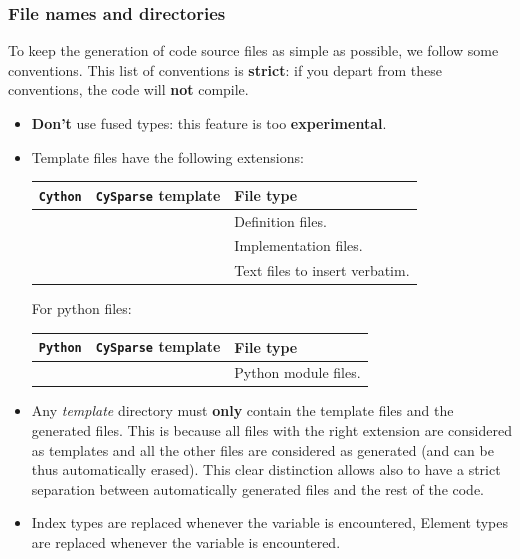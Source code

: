 \documentclass[letterpaper,10pt,english]{sphinxmanual}
\begin{document}
\subsubsection{File names and directories}
\label{cysparse_lib_mainteners:file-names-and-directories}
To keep the generation of code source files as simple as possible, we follow some conventions. This list of conventions is \textbf{strict}: if you depart from these conventions, the code will \textbf{not} compile.
\begin{itemize}
\item {} 
\textbf{Don't} use fused types: this feature is too \textbf{experimental}.

\item {} 
Template files have the following extensions:

\begin{tabulary}{\linewidth}{|L|L|L|}
\hline
\textsf{\relax 
\textbf{\texttt{Cython}}
} & \textsf{\relax 
\textbf{\texttt{CySparse}} template
} & \textsf{\relax 
File type
}\\
\hline
{}
 & 
 & 
Definition files.
\\
\hline
{}
 & 
 & 
Implementation files.
\\
\hline
{}
 & 
 & 
Text files to insert verbatim.
\\
\hline\end{tabulary}


For python files:

\begin{tabulary}{\linewidth}{|L|L|L|}
\hline
\textsf{\relax 
\textbf{\texttt{Python}}
} & \textsf{\relax 
\textbf{\texttt{CySparse}} template
} & \textsf{\relax 
File type
}\\
\hline
{}
 & 
 & 
Python module files.
\\
\hline\end{tabulary}


\item {} 
Any \emph{template} directory must \textbf{only} contain the template files and the generated files. This is because
all files with the right extension are considered as templates and all the other files are considered as generated
(and can be thus automatically erased). This clear distinction allows also to have a strict separation between
automatically generated files and the rest of the code.

\item {} 
Index types are replaced whenever the variable  is encountered, Element types are replaced whenever the variable  is encountered.


\end{itemize}
\end{document}
